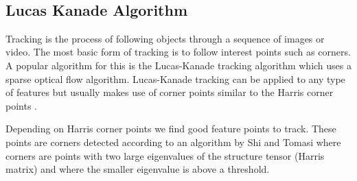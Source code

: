 \documentclass[12pt,fleqn]{book} %
\begin{document}
\begin{figure}[h]
\begin{dBox}
\centering
  \mbox{
   }
   \caption{\label{fig:dynamic91011} }   
\end{dBox}   
\end{figure}

\subsection{Lucas Kanade Algorithm \cite{dynamic4}}
Tracking is the process of following objects through a sequence of images or video. The most basic form of tracking is to follow interest points such as corners. A popular algorithm for this is the Lucas-Kanade tracking algorithm which uses a sparse optical flow algorithm. Lucas-Kanade tracking can be applied to any type of features but usually makes use of corner points similar to the Harris corner points \cite{dynamic6} .\bigskip

Depending on Harris corner points we find good feature points to track. These points are corners detected according to an algorithm by Shi and Tomasi \cite{dynamic7}  where corners are points with two large eigenvalues of the structure tensor (Harris matrix) and where the smaller eigenvalue is above a threshold.\bigskip
\end{document}
